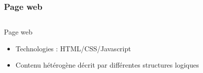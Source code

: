 \documentclass[]{beamer}
\begin{document}
\begin{frame}
	\frametitle{Page web}
	\begin{columns}
	\begin{column}{5cm}
		\begin{block}{Page web}
		\begin{itemize}
			\item Technologies : HTML/CSS/Javascript
			\item Contenu hétérogène décrit par différentes structures logiques
		\end{itemize}
		\end{block}
	\end{column}
	\begin{column}{5cm}
	\end{column}
	\end{columns}
\end{frame}
\end{document}
